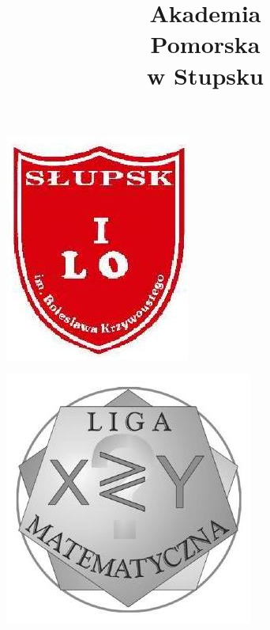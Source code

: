 \documentclass[10pt]{article}
\title{Akademia \\
 Pomorska \\
 w Stupsku }
\author{}
\date{}
\begin{document}
\maketitle
\begin{center}
\includegraphics[max width=\textwidth]{2024_11_21_823cc8b405444b8ad8bfg-1}
\end{center}

\begin{center}
\includegraphics[max width=\textwidth]{2024_11_21_823cc8b405444b8ad8bfg-1(2)}
\end{center}
\end{document}
